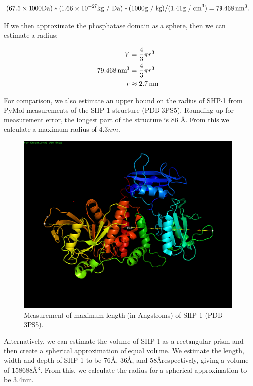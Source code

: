 \documentclass[../../AdvancementSummary.tex]{subfiles}
\begin{document}
\begin{equation*}
(67.5 \times 1000 \mbox{Da}) * (1.66\times10^{-27} \mbox{kg / Da}) * (1000 \mbox{g / kg}) / (1.41 \mbox{g / cm}^3) = 79.468 \,\mbox{nm}^3.
\end{equation*}

If we then approximate the phosphatase domain as a sphere, then we can estimate a radius: 

\begin{align*}
V &= \frac{4}{3}\pi r^3 \\
79.468 \,\mbox{nm}^3 &= \frac{4}{3} \pi r^3 \\
r &\approx 2.7 \,\mbox{nm} \\
\end{align*}

For comparison, we also estimate an upper bound on the radius of SHP-1 from PyMol measurements of the SHP-1 structure (PDB 3PS5). Rounding up for measurement error, the longest part of the structure is 86 \AA. From this we calculate a maximum radius of 4.3$nm$.

\begin{figure}[H]
\includegraphics[width=\linewidth]{ResultsFigures/SHP1PyMol/Diagonal1.png}
\caption{Measurement of maximum length (in Angstroms) of SHP-1 (PDB 3PS5). }
\end{figure}

Alternatively, we can estimate the volume of SHP-1 as a rectangular prism and then create a spherical approximation of equal volume. We estimate the length, width and depth of SHP-1 to be 76\AA, 36\AA, and 58\AA respectively, giving a volume of 158688\AA$^3$.  From this, we calculate the radius for a spherical approximation to be 3.4nm.
\end{document}
